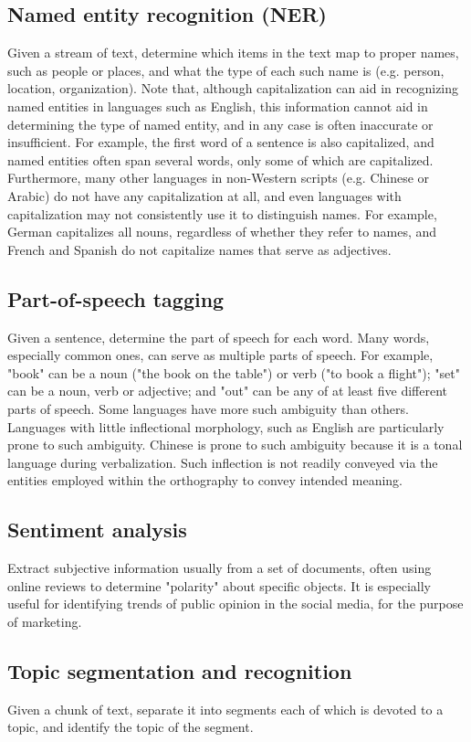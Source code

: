 \documentclass[12pt]{book}
\begin{document}
\subsection{Named entity recognition (NER)}
Given a stream of text, determine which items in the text map to proper names, such as people or places, and what the type of each such name is (e.g. person, location, organization). Note that, although capitalization can aid in recognizing named entities in languages such as English, this information cannot aid in determining the type of named entity, and in any case is often inaccurate or insufficient. For example, the first word of a sentence is also capitalized, and named entities often span several words, only some of which are capitalized. Furthermore, many other languages in non-Western scripts (e.g. Chinese or Arabic) do not have any capitalization at all, and even languages with capitalization may not consistently use it to distinguish names. For example, German capitalizes all nouns, regardless of whether they refer to names, and French and Spanish do not capitalize names that serve as adjectives.
\subsection{Part-of-speech tagging}
Given a sentence, determine the part of speech for each word. Many words, especially common ones, can serve as multiple parts of speech. For example, "book" can be a noun ("the book on the table") or verb ("to book a flight"); "set" can be a noun, verb or adjective; and "out" can be any of at least five different parts of speech. Some languages have more such ambiguity than others. Languages with little inflectional morphology, such as English are particularly prone to such ambiguity. Chinese is prone to such ambiguity because it is a tonal language during verbalization. Such inflection is not readily conveyed via the entities employed within the orthography to convey intended meaning.
\subsection{Sentiment analysis}
Extract subjective information usually from a set of documents, often using online reviews to determine "polarity" about specific objects. It is especially useful for identifying trends of public opinion in the social media, for the purpose of marketing.
\subsection{Topic segmentation and recognition}
Given a chunk of text, separate it into segments each of which is devoted to a topic, and identify the topic of the segment.
\end{document}
